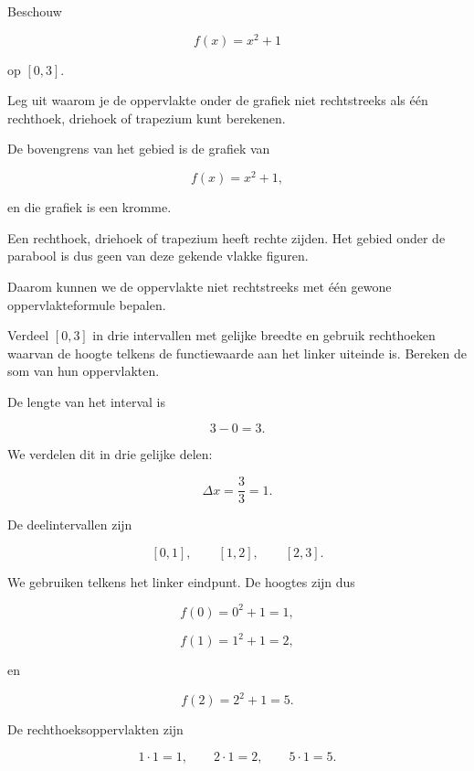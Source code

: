 \documentclass{ximera}
\begin{document}
\begin{oefening}{\oefG}

Beschouw

\[
f(x)=x^2+1
\]

op \([0,3]\).

\begin{question}
Leg uit waarom je de oppervlakte onder de grafiek niet rechtstreeks als
één rechthoek, driehoek of trapezium kunt berekenen.

\begin{oplossing}

De bovengrens van het gebied is de grafiek van

\[
f(x)=x^2+1,
\]

en die grafiek is een kromme.

Een rechthoek, driehoek of trapezium heeft rechte zijden. Het gebied
onder de parabool is dus geen van deze gekende vlakke figuren.

Daarom kunnen we de oppervlakte niet rechtstreeks met één gewone
oppervlakteformule bepalen.

\end{oplossing}
\end{question}

\begin{question}
Verdeel \([0,3]\) in drie intervallen met gelijke breedte en gebruik
rechthoeken waarvan de hoogte telkens de functiewaarde aan het linker
uiteinde is. Bereken de som van hun oppervlakten.

\begin{oplossing}

De lengte van het interval is

\[
3-0=3.
\]

We verdelen dit in drie gelijke delen:

\[
\Delta x=\frac{3}{3}=1.
\]

De deelintervallen zijn

\[
[0,1],\qquad [1,2],\qquad [2,3].
\]

We gebruiken telkens het linker eindpunt. De hoogtes zijn dus

\[
f(0)=0^2+1=1,
\]

\[
f(1)=1^2+1=2,
\]

en

\[
f(2)=2^2+1=5.
\]

De rechthoeksoppervlakten zijn

\[
1\cdot1=1,\qquad
2\cdot1=2,\qquad
5\cdot1=5.
\]


\end{oplossing}
\end{question}
\end{oefening}
\end{document}
